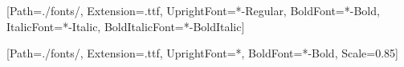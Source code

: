 \usepackage{geometry}
\usepackage{fontspec}
\usepackage{xcolor}
\usepackage{fancyhdr}
\usepackage{setspace}
\usepackage{array}
\usepackage{ragged2e}
\usepackage{titlesec}
\usepackage{indentfirst}
\usepackage[titles]{tocloft}
\usepackage{enumitem}
\usepackage{listings}
\usepackage{chngcntr}
\usepackage{xltabular}
\usepackage{graphicx}
\usepackage{caption}
\usepackage{color}
\usepackage{hyperref}

\usepackage{amsmath,amssymb}

\usepackage{tikz}
\usetikzlibrary{arrows.meta, positioning, shapes.geometric, shapes.multipart, calc}
\setmainfont{LiberationSerif}[Path=./fonts/, Extension=.ttf, UprightFont=*-Regular, BoldFont=*-Bold, ItalicFont=*-Italic, BoldItalicFont=*-BoldItalic]

\sloppy
\setmonofont{DejaVuSansMono}[Path=./fonts/, Extension=.ttf, UprightFont=*, BoldFont=*-Bold, Scale=0.85]
